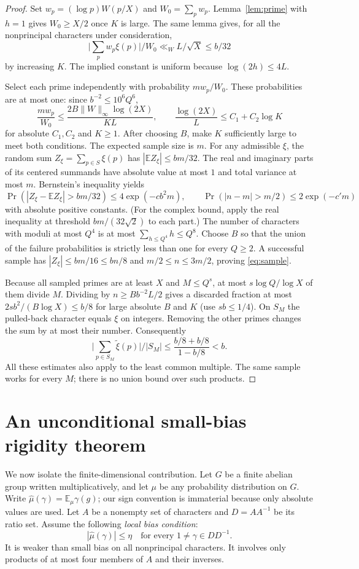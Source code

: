 \documentclass[11pt]{article}
\theoremstyle{definition}\newtheorem{remark}[theorem]{Remark}
\newcommand{\E}{\mathbb E}
\newcommand{\abs}[1]{\lvert #1\rvert}
\newcommand{\norm}[1]{\lVert #1\rVert}
\begin{document}
\begin{proof}
Set $w_p=(\log p)W(p/X)$ and $W_0=\sum_p w_p$. Lemma~\ref{lem:prime} with $h=1$ gives $W_0\ge X/2$ once $K$ is large. The same lemma gives, for all the nonprincipal characters under consideration,
\[
 \abs{\sum_p w_p\xi(p)}/W_0\ll_W L/\sqrt X\le b/32
\]
by increasing $K$. The implied constant is uniform because $\log(2h)\le4L$.

Select each prime independently with probability $m w_p/W_0$. These probabilities are at most one: since $b^{-2}\le 10^6Q^6$,
\[
 \frac{m w_p}{W_0}\le\frac{2B\norm W_\infty\log(2X)}{KL},\qquad
 \frac{\log(2X)}{L}\le C_1+C_2\log K
\]
for absolute $C_1,C_2$ and $K\ge1$. After choosing $B$, make $K$ sufficiently large to meet both conditions. The expected sample size is $m$. For any admissible $\xi$, the random sum $Z_\xi=\sum_{p\in S}\xi(p)$ has $|\E Z_\xi|\le bm/32$. The real and imaginary parts of its centered summands have absolute value at most $1$ and total variance at most $m$. Bernstein's inequality yields
\[
 \Pr(|Z_\xi-\E Z_\xi|>bm/32)\le4\exp(-c b^2m),
 \qquad \Pr(|n-m|>m/2)\le2\exp(-c' m)
\]
with absolute positive constants. (For the complex bound, apply the real inequality at threshold $bm/(32\sqrt2)$ to each part.) The number of characters with moduli at most $Q^4$ is at most $\sum_{h\le Q^4}h\le Q^8$. Choose $B$ so that the union of the failure probabilities is strictly less than one for every $Q\ge2$. A successful sample has $|Z_\xi|\le bm/16\le bn/8$ and $m/2\le n\le 3m/2$, proving \eqref{eq:sample}.

Because all sampled primes are at least $X$ and $M\le Q^s$, at most $s\log Q/\log X$ of them divide $M$. Dividing by $n\ge Bb^{-2}L/2$ gives a discarded fraction at most $2sb^2/(B\log X)\le b/8$ for large absolute $B$ and $K$ (use $sb\le1/4$). On $S_M$ the pulled-back character equals $\xi$ on integers. Removing the other primes changes the sum by at most their number. Consequently
\[
 \abs{\sum_{p\in S_M}\widetilde\xi(p)}/|S_M|
 \le\frac{b/8+b/8}{1-b/8}<b.
\]
All these estimates also apply to the least common multiple. The same sample works for every $M$; there is no union bound over such products.
\end{proof}

\section{An unconditional small-bias rigidity theorem}
\label{sec:rigid}
We now isolate the finite-dimensional contribution. Let $G$ be a finite abelian group written multiplicatively, and let $\mu$ be any probability distribution on $G$. Write $\widehat\mu(\gamma)=\E_\mu\gamma(g)$; our sign convention is immaterial because only absolute values are used. Let $A$ be a nonempty set of characters and $D=AA^{-1}$ be its ratio set. Assume the following \emph{local bias condition}:
\begin{equation}\label{eq:localbias}
 |\widehat\mu(\gamma)|\le\eta\quad\text{for every }1\ne\gamma\in DD^{-1}.
\end{equation}
It is weaker than small bias on all nonprincipal characters. It involves only products of at most four members of $A$ and their inverses.
\end{document}
